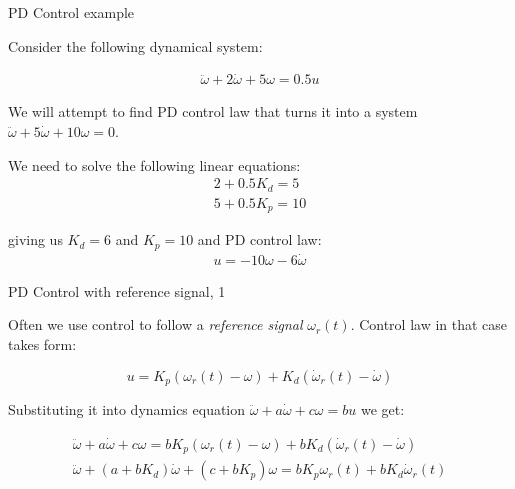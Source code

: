 \documentclass{beamer}
\begin{document}
\begin{frame}{PD Control example}
	\begin{flushleft}
		
		Consider the following dynamical system:
		
		\begin{align}
			\ddot \omega  + 2 \dot \omega  + 5\omega = 0.5 u
		\end{align}
		
		We will attempt to find PD control law that turns it into a system $\ddot \omega  + 5 \dot \omega  + 10\omega = 0$.
		
		\bigskip
		
		We need to solve the following linear equations:
		\begin{align}
			2 + 0.5 K_d = 5 \\
			5 + 0.5 K_p = 10
		\end{align}
		
		giving us $K_d = 6$ and $K_p = 10$ and PD control law:
		\begin{align}
			u = - 10 \omega - 6 \dot \omega
		\end{align}
		
	\end{flushleft}
\end{frame}



\begin{frame}{PD Control with reference signal, 1}
	\begin{flushleft}
		
		Often we use control to follow a \emph{reference signal} $\omega_r(t)$. Control law in that case takes form:
		
		\begin{equation}
			u = K_p (\omega_r(t) - \omega) + K_d (\dot \omega_r(t) - \dot \omega)
		\end{equation}
		
		Substituting it into dynamics equation $\ddot \omega  + a\dot \omega  + c\omega =
		b u $ we get:
		
		\begin{align}
			\ddot \omega  + a\dot \omega  + c\omega =
			b K_p (\omega_r(t) - \omega) + b K_d (\dot \omega_r(t) - \dot \omega)
			\\
			\ddot \omega  + (a + b K_d )\dot \omega  + (c + b K_p)\omega =
			b K_p \omega_r(t) + b K_d \dot \omega_r(t)
		\end{align}
		
		
	\end{flushleft}
\end{frame}
\end{document}

